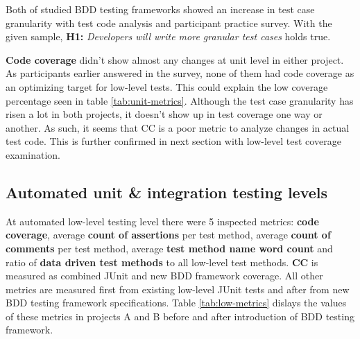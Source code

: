 Both of studied BDD testing frameworks showed an increase in test case granularity with test code analysis and participant practice
survey. With the given sample, \textbf{H1:} \textit{Developers will write more granular test cases} holds true.

\textbf{Code coverage} didn't show almost any changes at unit level in either project. As participants earlier answered in the survey, none
of them had code coverage as an optimizing target for low-level tests. This could explain the low coverage percentage seen in
table \ref{tab:unit-metrics}. Although the test case granularity has risen a lot in both projects, it doesn't
show up in test coverage one way or another. As such, it seems that CC is a poor metric to analyze changes in actual test
code. This is further confirmed in next section with low-level test coverage examination.

\subsection{Automated unit \& integration testing levels}
\label{subsub:low-level-metrics}
At automated low-level testing level there were 5 inspected metrics: \textbf{code coverage}, average \textbf{count of assertions} per test method,
average \textbf{count of comments} per test method, average \textbf{test method name word count} and ratio of \textbf{data driven test methods} to
all low-level test methods. \textbf{CC} is measured as combined JUnit and new BDD framework coverage. All other metrics
are measured first from existing low-level JUnit tests and after from new BDD testing framework specifications.
Table \ref{tab:low-metrics} dislays the values of these metrics in projects A and B before and after introduction of BDD testing framework.


